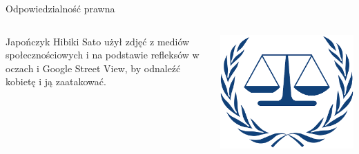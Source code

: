 \begin{frame}{Odpowiedzialność prawna}
    \begin{columns}[c]
      \begin{block}{}
        Japończyk Hibiki Sato użył zdjęć z mediów społecznościowych i na podstawie refleksów w oczach i Google Street View, by odnaleźć kobietę i ją zaatakować.
      \end{block}
      \includegraphics[width=1\textwidth]{images/law.png}
  \end{columns}
\end{frame}